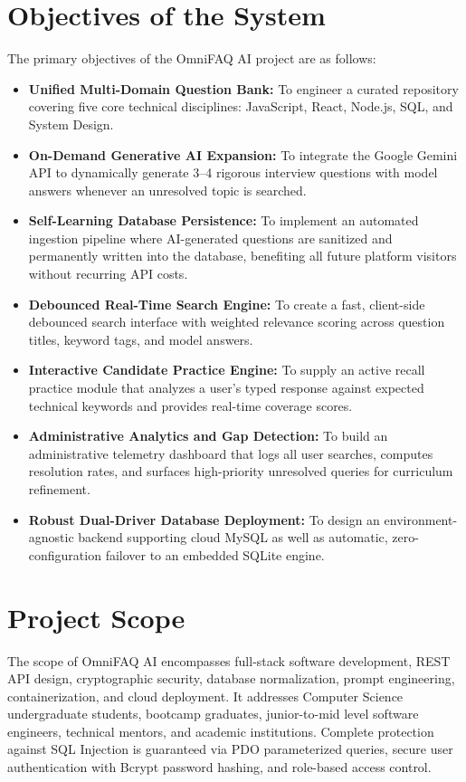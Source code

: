 \documentclass[12pt,a4paper]{report}
\begin{document}
\section{Objectives of the System}
The primary objectives of the OmniFAQ AI project are as follows:
\begin{itemize}
    \item \textbf{Unified Multi-Domain Question Bank:} To engineer a curated repository covering five core technical disciplines: JavaScript, React, Node.js, SQL, and System Design.
    \item \textbf{On-Demand Generative AI Expansion:} To integrate the Google Gemini API to dynamically generate 3--4 rigorous interview questions with model answers whenever an unresolved topic is searched.
    \item \textbf{Self-Learning Database Persistence:} To implement an automated ingestion pipeline where AI-generated questions are sanitized and permanently written into the database, benefiting all future platform visitors without recurring API costs.
    \item \textbf{Debounced Real-Time Search Engine:} To create a fast, client-side debounced search interface with weighted relevance scoring across question titles, keyword tags, and model answers.
    \item \textbf{Interactive Candidate Practice Engine:} To supply an active recall practice module that analyzes a user's typed response against expected technical keywords and provides real-time coverage scores.
    \item \textbf{Administrative Analytics and Gap Detection:} To build an administrative telemetry dashboard that logs all user searches, computes resolution rates, and surfaces high-priority unresolved queries for curriculum refinement.
    \item \textbf{Robust Dual-Driver Database Deployment:} To design an environment-agnostic backend supporting cloud MySQL as well as automatic, zero-configuration failover to an embedded SQLite engine.
\end{itemize}

\section{Project Scope}
The scope of OmniFAQ AI encompasses full-stack software development, REST API design, cryptographic security, database normalization, prompt engineering, containerization, and cloud deployment. It addresses Computer Science undergraduate students, bootcamp graduates, junior-to-mid level software engineers, technical mentors, and academic institutions. Complete protection against SQL Injection is guaranteed via PDO parameterized queries, secure user authentication with Bcrypt password hashing, and role-based access control.
\end{document}
